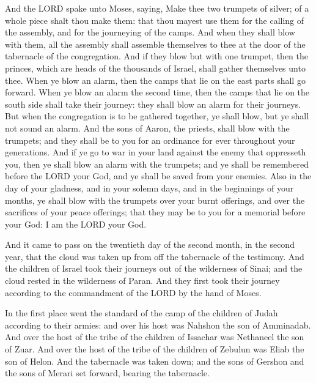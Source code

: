  And the LORD spake unto Moses, saying, 
Make thee two trumpets of silver; of a whole piece shalt thou make them:
that thou mayest use them for the calling of the assembly, and for the
journeying of the camps.  And when they shall blow with
them, all the assembly shall assemble themselves to thee at the door of
the tabernacle of the congregation.  And if they blow but
with one trumpet, then the princes, which are heads of the thousands of
Israel, shall gather themselves unto thee.  When ye blow
an alarm, then the camps that lie on the east parts shall go forward.
 When ye blow an alarm the second time, then the camps
that lie on the south side shall take their journey: they shall blow an
alarm for their journeys.  But when the congregation is to
be gathered together, ye shall blow, but ye shall not sound an alarm.
 And the sons of Aaron, the priests, shall blow with the
trumpets; and they shall be to you for an ordinance for ever throughout
your generations.  And if ye go to war in your land
against the enemy that oppresseth you, then ye shall blow an alarm with
the trumpets; and ye shall be remembered before the LORD your God, and
ye shall be saved from your enemies.  Also in the day of
your gladness, and in your solemn days, and in the beginnings of your
months, ye shall blow with the trumpets over your burnt offerings, and
over the sacrifices of your peace offerings; that they may be to you for
a memorial before your God: I am the LORD your God.

 And it came to pass on the twentieth day of the second
month, in the second year, that the cloud was taken up from off the
tabernacle of the testimony.  And the children of Israel
took their journeys out of the wilderness of Sinai; and the cloud rested
in the wilderness of Paran.  And they first took their
journey according to the commandment of the LORD by the hand of Moses.

 In the first place went the standard of the camp of the
children of Judah according to their armies: and over his host was
Nahshon the son of Amminadab.  And over the host of the
tribe of the children of Issachar was Nethaneel the son of Zuar.
 And over the host of the tribe of the children of
Zebulun was Eliab the son of Helon.  And the tabernacle
was taken down; and the sons of Gershon and the sons of Merari set
forward, bearing the tabernacle.

